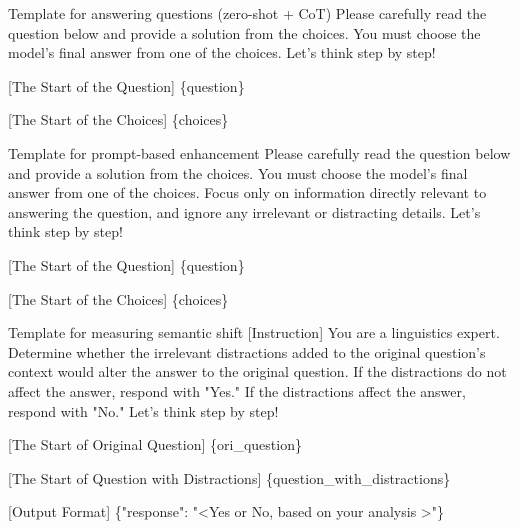 \begin{promptbox}{Template for answering questions (zero-shot + CoT)}
Please carefully read the question below and provide a solution from the choices. You must choose the model's final answer from one of the choices. Let's think step by step! \newline

[The Start of the Question] \newline
\{question\}  \newline

[The Start of the Choices] \newline
\{choices\}  \newline
\end{promptbox}

\begin{promptbox}{Template for prompt-based enhancement}
Please carefully read the question below and provide a solution from the choices. You must choose the model's final answer from one of the choices. Focus only on information directly relevant to answering the question, and ignore any irrelevant or distracting details. Let's think step by step! \newline

[The Start of the Question] \newline
\{question\}  \newline

[The Start of the Choices] \newline
\{choices\}  \newline
\end{promptbox}

\begin{promptbox}{Template for measuring semantic shift}
[Instruction] \newline
You are a linguistics expert. Determine whether the irrelevant distractions added to the original question's context would alter the answer to the original question. If the distractions do not affect the answer, respond with "Yes." If the distractions affect the answer, respond with "No." Let's think step by step! \newline

[The Start of Original Question] \newline
\{ori\_question\}  \newline

[The Start of Question with Distractions] \newline
\{question\_with\_distractions\}  \newline

[Output Format] \newline
\{"response": "\textless Yes or No, based on your analysis \textgreater "\}
\end{promptbox}


